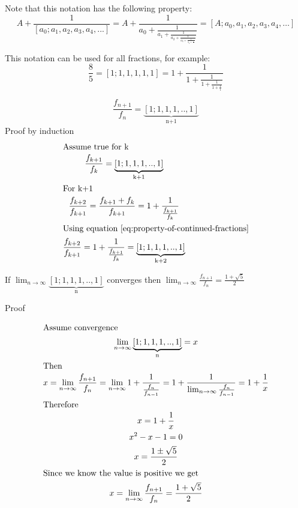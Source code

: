 \documentclass[a4paper]{article}
\begin{document}
Note that this notation has the following property:
\begin{equation}\label{eq:property-of-continued-fractions}
A + \frac{1}{[a_0;a_1,a_2,a_3,a_4, ...]} = A + \frac{1}{a_0 + \frac{1}{a_1 + \frac{1}{a_2 + \frac{1}{a_3 +  \frac{1}{a_4 + \frac{1}{...}}}}}}
= [A; a_0,a_1,a_2,a_3,a_4, \dots]
\end{equation}

This notation can be used for all fractions, for example:
\begin{equation*}
\frac{8}{5} = [1;1,1,1,1, 1] =  1 + \frac{1}{1 + \frac{1}{1 + \frac{1}{1 + \frac{1}{1} }}}
\end{equation*}

\begin{theorem}
\[
\frac{f_{n+1}}{f_{n}} = \underbrace{[1;1,1,1,..,1]}_\text{n+1}
\]
Proof by induction
\begin{gather*}
\shortintertext{Assume true for k}
\frac{f_{k+1}}{f_{k}} = \underbrace{[1;1,1,1,..,1]}_\text{k+1} \\
\shortintertext{For k+1}
\frac{f_{k+2}}{f_{k+1}} = \frac{f_{k+1} + f_{k}}{f_{k+1}} = 1 + \frac{1}{\frac{f_{k+1}}{f_{k}}}
\\
\shortintertext{Using equation~\ref{eq:property-of-continued-fractions}}
\frac{f_{k+2}}{f_{k+1}} = 1 + \frac{1}{\frac{f_{k+1}}{f_{k}}} = \underbrace{[1;1,1,1,..,1]}_\text{k+2}\\
\end{gather*}
\end{theorem}

\begin{theorem}
If $\lim_{n \to \infty} \underbrace{[1;1,1,1,..,1]}_\text{n} $ converges then  $\lim_{n \to \infty} \frac{f_{n+1}}{f_{n}} = \frac{1+ \sqrt{5}}{2} $

Proof

\begin{gather*}
\shortintertext{Assume convergence}
\lim_{n \to \infty} \underbrace{[1;1,1,1,..,1]}_\text{n} = x\\
\shortintertext{Then}
x = \lim_{n \to \infty} \frac{f_{n+1}}{f_{n}} = \lim_{n \to \infty} 1 + \frac{1}{\frac{f_{n}}{f_{n-1}}} =  1 + \frac{1}{ \lim_{n \to \infty} \frac{f_{n}}{f_{n-1}}} = 1 + \frac{1}{x} \\
\shortintertext{Therefore}
x = 1 + \frac{1}{x}\\
x^2 - x  -1 = 0\\
x= \frac{1 \pm \sqrt{5}}{2}\\
\shortintertext{Since we know the value is positive we get}
x = \lim_{n \to \infty} \frac{f_{n+1}}{f_{n}}= \frac{1 + \sqrt{5}}{2}\\
\end{gather*}
\end{theorem}
\end{document}
